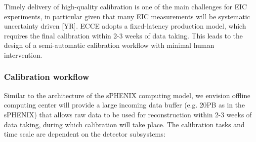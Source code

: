 


Timely delivery of high-quality calibration is one of the main challenges for EIC experiments, in particular given that many EIC measurements will be systematic uncertainty driven [YR]. ECCE adopts a fixed-latency production model, which requires the final calibration within 2-3 weeks of data taking. This leads to the design of a semi-automatic calibration workflow with minimal human intervention. 

\subsubsection{Calibration workflow}


Similar to the architecture of the sPHENIX computing model, we envision offline computing center will provide a large incoming data buffer (e.g. 20PB as in the sPHENIX) that allows raw data to be used for reconstruction within 2-3 weeks of data taking, during which calibration will take place. The calibration tasks and time scale are dependent on the detector subsystems: 

